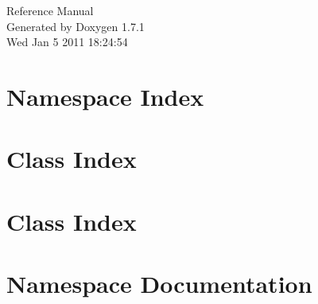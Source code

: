 \documentclass[a4paper]{book}
\begin{document}
\hypersetup{pageanchor=false}
\begin{titlepage}
\vspace*{7cm}
\begin{center}
{\Large Reference Manual}\\
\vspace*{1cm}
{\large Generated by Doxygen 1.7.1}\\
\vspace*{0.5cm}
{\small Wed Jan 5 2011 18:24:54}\\
\end{center}
\end{titlepage}
\clearemptydoublepage
{}
\tableofcontents
\clearemptydoublepage
{}
\hypersetup{pageanchor=true}
\chapter{Namespace Index}

\chapter{Class Index}

\chapter{Class Index}

\chapter{Namespace Documentation}


\end{document}
